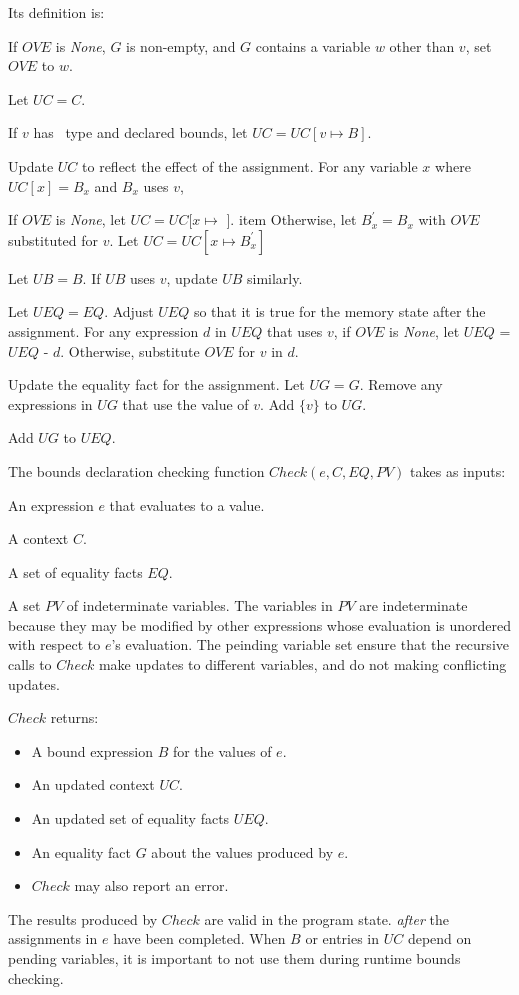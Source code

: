 Its definition is:
\begin{compactenum}
\item If $OVE$ is {\em None}, $G$ is non-empty, and $G$ contains a variable $w$ other than $v$,
set $OVE$ to $w$. 
\item Let $UC = C$.
\item If $v$ has \arrayptr\ type and declared bounds, let $UC = UC[v \mapsto B]$.
\item Update $UC$ to reflect the effect of the assignment.  For any variable $x$ where $UC[x] = B_x$ and
$B_x$ uses $v$,
\begin{compactenum}
\item If $OVE$ is {\it None}, let $UC = UC[x \mapsto$ \boundsunknown $]$.
item  Otherwise, let $B_x^\prime = B_x$ with $OVE$ substituted for $v$.  
Let $UC = UC[x \mapsto B_x^\prime]$
\end{compactenum}
\item Let $UB = B$.  If $UB$ uses $v$, update $UB$ similarly.
\item Let $UEQ = EQ$.  Adjust $UEQ$ so that it is true for the memory state after the assignment. For any expression $d$ in $UEQ$ that uses $v$, if $OVE$ is {\it None}, let $UEQ$ = $UEQ $ - $d$. Otherwise,
substitute $OVE$ for $v$ in $d$.
\item Update the equality fact for the assignment.   Let $UG = G$.  Remove any expressions in $UG$
that use the value of $v$. Add $\{v\}$ to $UG$.
\item Add $UG$ to $UEQ$.
\end{compactenum}

The bounds declaration checking function $Check(e, C, EQ, PV)$   takes as inputs:
\begin{compactenum}
\item An expression $e$ that evaluates to a value.
\item A context $C$.
\item A set of equality facts $EQ$.
\item A set $PV$ of  indeterminate variables.  The variables in $PV$ are indeterminate because they
may be modified by other expressions whose  evaluation is unordered with respect to $e$'s evaluation.
The peinding variable set ensure that the recursive calls to $Check$ make updates to different
variables, and do not making conflicting updates.
\end{compactenum}

$Check$ returns:
\begin{itemize}
\item A bound expression $B$ for the values of $e$.
\item An updated context $UC$.
\item An updated set of equality facts $UEQ$.
\item An equality fact $G$ about the values produced by $e$. 
\item $Check$ may also report an error.
\end{itemize}
The results produced by $Check$ are valid in the program state.
{\em after} the assignments in $e$ have been completed.   When $B$ or entries in 
$UC$ depend on pending variables, it is important to not use them during runtime bounds checking.

